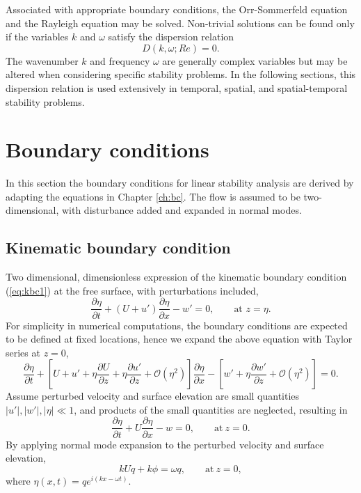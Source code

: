 Associated with appropriate boundary conditions, the Orr-Sommerfeld equation and the Rayleigh equation may be solved. Non-trivial solutions can be found only if the variables $k$ and $\omega$ satisfy the dispersion relation
\begin{equation}
    D(k,\omega;Re)=0.
    \label{eq:dp}
\end{equation}
The wavenumber $k$ and frequency $\omega$ are generally complex variables but may be altered when considering specific stability problems. In the following sections, this dispersion relation is used extensively in temporal, spatial, and spatial-temporal stability problems.

\section{Boundary conditions}
In this section the boundary conditions for linear stability analysis are derived by adapting the equations in Chapter \ref{ch:bc}. The flow is assumed to be two-dimensional, with disturbance added and expanded in normal modes.
\subsection{Kinematic boundary condition}
Two dimensional, dimensionless expression of the kinematic boundary condition (\ref{eq:kbc1}) at the free surface, with perturbations included,
\begin{equation}
    \frac{\partial \eta }{\partial t} +(U+u')\frac{\partial \eta }{\partial x}-w'=0,\qquad \text{{at }} z=\eta.
\end{equation}
For simplicity in numerical computations, the boundary conditions are expected to be defined at fixed locations, hence we expand the above equation with Taylor series at $z=0$,
\begin{equation}
    \frac{\partial \eta }{\partial t} +\left[ U +u' +\eta \frac{\partial U}{\partial z} +\eta \frac{\partial u'}{\partial z} +\mathcal{O}(\eta^2) \right]\frac{\partial \eta }{\partial x} -\left[ w' +\eta \frac{\partial w'}{\partial z}+\mathcal{O}(\eta^2)\right] =0.
\end{equation}
Assume perturbed velocity and surface elevation are small quantities $|u'|,|w'|,|\eta|\ll1$, and products of the small quantities are neglected, resulting in 
\begin{equation}
    \frac{\partial \eta }{\partial t} + U\frac{\partial \eta }{\partial x} -w =0,\qquad\text{at}\ z=0.
\end{equation}
By applying normal mode expansion to the perturbed velocity and surface elevation,
\begin{equation}
    kUq+k\phi=\omega q,\qquad\text{at}\ z=0,
    \label{eq:kbc}
\end{equation}
where $\eta(x,t)=qe^{i(kx-\omega t)}$.

